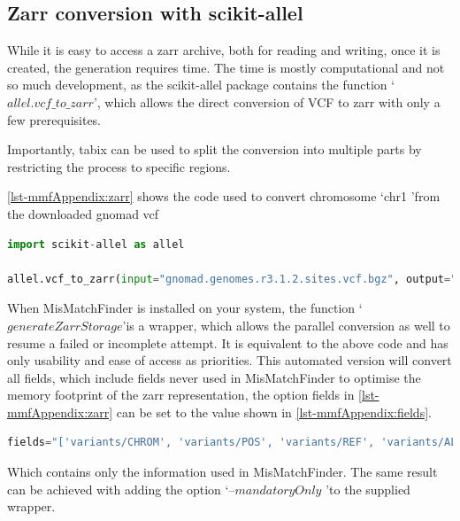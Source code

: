 \subsection{Zarr conversion with scikit-allel}
\label{ch-mmfAppendix:zarr}
While it is easy to access a zarr archive, both for reading and writing, once it is created, the generation requires time. The time is mostly computational and not so much development, as the scikit-allel package contains the function \lq$allel.vcf\_to\_zarr$\rq, which allows the direct conversion of VCF to zarr with only a few prerequisites. 

Importantly, tabix \cite{Li2011} can be used to split the conversion into multiple parts by restricting the process to specific regions.

\autoref{lst-mmfAppendix:zarr} shows the code used to convert chromosome \lq chr1 \rq from the downloaded gnomad vcf

\begin{lstlisting}[language=Python, caption=scikit-allel conversion vcf\_to\_zarr, label={lst-mmfAppendix:zarr}]
import scikit-allel as allel

allel.vcf_to_zarr(input="gnomad.genomes.r3.1.2.sites.vcf.bgz", output="/out/put/folder/",  group="chr1", region="chr1", fields="*")
\end{lstlisting}

When MisMatchFinder is installed on your system, the function \lq$generateZarrStorage$\rq is a wrapper, which allows the parallel conversion as well to resume a failed or incomplete attempt. It is equivalent to the above code and has only usability and ease of access as priorities. This automated version will convert all fields, which include fields never used in MisMatchFinder to optimise the memory footprint of the zarr representation, the option fields in \autoref{lst-mmfAppendix:zarr} can be set to the value shown in \autoref{lst-mmfAppendix:fields}.
\begin{lstlisting}[language=Python, caption=field options for reduced memory, label={lst-mmfAppendix:fields}]
fields="['variants/CHROM', 'variants/POS', 'variants/REF', 'variants/ALT', 'variants/AF', 'variants/FILTER_PASS']"
\end{lstlisting}
Which contains only the information used in MisMatchFinder. The same result can be achieved with adding the option \lq --$mandatoryOnly$ \rq to the supplied wrapper.


